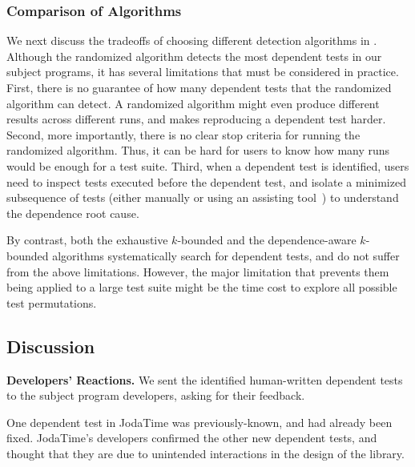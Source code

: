 \subsubsection{Comparison of Algorithms}
\label{sec:algcomparison}

We next discuss the tradeoffs of choosing different detection
algorithms in \ourtool. Although the randomized algorithm
detects the most dependent tests in our subject programs,
it has several limitations that must be considered
in practice. First, there is no guarantee of how many
dependent tests that the randomized algorithm can detect. A randomized
algorithm might even produce different results across different runs,
and makes reproducing a dependent test harder.
Second, more importantly, there is no clear stop criteria
for running the randomized algorithm.
Thus, it can be hard for users
to know how many runs would be enough for a test suite.
Third, when a dependent test is identified, users
need to inspect tests executed
before the dependent test, and isolate a minimized
subsequence of tests (either
manually or using an assisting tool~\cite{Zeller:2002}) to understand the dependence root cause.

By contrast, both the exhaustive $k$-bounded and the dependence-aware
$k$-bounded algorithms systematically search for dependent
tests, and do not suffer from the above limitations.
However, the major limitation that prevents them being applied to a
large test suite might be the time cost to
explore all possible test permutations.





\subsection{Discussion}
\label{sec:expdiscussion}


\noindent \textbf{Developers' Reactions.}
We sent the identified human-written dependent tests to the
subject program developers, asking for their feedback.

One dependent test in JodaTime was previously-known,
and had already been fixed. JodaTime's
developers confirmed the other new dependent
tests, and thought that they are due to unintended interactions
in the design of the library.


